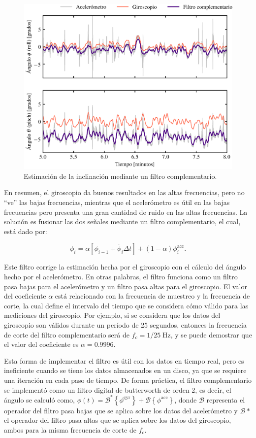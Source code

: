 \documentclass[11pt]{article}
\begin{document}
\begin{figure}[htpb]
  \centering
  \includegraphics[width=0.8\linewidth]{./figures/gyroscope_vs_accelerometer.png}
  \caption{Estimación de la inclinación mediante un filtro complementario.}
  \label{fig:gyroscope_vs_accelerometer}
\end{figure}

En resumen, el giroscopio da buenos resultados en las altas frecuencias, pero no
``ve'' las bajas frecuencias, mientras que el acelerómetro es útil en las bajas
frecuencias pero presenta una gran cantidad de ruido en las altas frecuencias.
La solución es fusionar las dos señales mediante un filtro complementario, el
cual, está dado por:

\begin{equation}
  \phi_{i} = \alpha \left[\phi_{i-1} + \dot{\phi_{i}} \Delta t \right] +
  (1-\alpha) \phi^\mathrm{acc}_{i}.
\end{equation}

Este filtro corrige la estimación hecha por el giroscopio con el cálculo del
ángulo hecho por el acelerómetro. En otras palabras, el filtro funciona como un
filtro pasa bajas para el acelerómetro y un filtro pasa altas para el
giroscopio. El valor del coeficiente $\alpha$ está relacionado con la frecuencia
de muestreo y la frecuencia de corte, la cual define el intervalo del tiempo que
se considera cómo válido para las mediciones del giroscopio. Por ejemplo, si se
considera que los datos del giroscopio son válidos durante un período de 25
segundos, entonces la frecuencia de corte del filtro complementario será de $f_c
= 1/25\;\mathrm{Hz}$, y se puede demostrar que el valor del coeficiente es
$\alpha = 0.9996$.

Esta forma de implementar el filtro es útil con los datos en tiempo real, pero
es ineficiente cuando se tiene los datos almacenados en un disco, ya que se
requiere una iteración en cada paso de tiempo. De forma práctica, el filtro
complementario se implementó como un filtro digital de butterworth de orden 2,
es decir, el ángulo se calculó como, $\phi(t) = \mathcal{B^*} \left\{
\phi^\mathrm{gyr} \right\} + \mathcal{B} \left\{ \phi^\mathrm{acc} \right\}$,
donde $\mathcal{B}$ representa el operador del filtro pasa bajas que se aplica
sobre los datos del acelerómetro y $\mathcal{B*}$ el operador del filtro pasa
altas que se aplica sobre los datos del giroscopio, ambos para la misma
frecuencia de corte de $f_c$.
\end{document}
